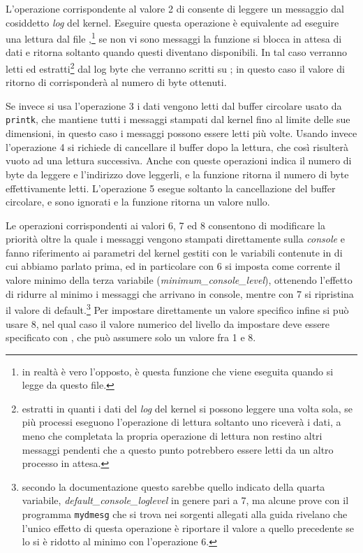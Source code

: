 L'operazione corrispondente al valore 2 di  consente di leggere un
messaggio dal cosiddetto \textit{log} del kernel. Eseguire questa operazione è
equivalente ad eseguire una lettura dal file
,\footnote{in realtà è vero l'opposto, è questa funzione
  che viene eseguita quando si legge da questo file.} se non vi sono messaggi
la funzione si blocca in attesa di dati e ritorna soltanto quando questi
diventano disponibili. In tal caso verranno letti ed
estratti\footnote{estratti in quanti i dati del \textit{log} del kernel si
  possono leggere una volta sola, se più processi eseguono l'operazione di
  lettura soltanto uno riceverà i dati, a meno che completata la propria
  operazione di lettura non restino altri messaggi pendenti che a questo punto
  potrebbero essere letti da un altro processo in attesa.} dal log 
byte che verranno scritti su ; in questo caso il valore di
ritorno di  corrisponderà al numero di byte ottenuti.

Se invece si usa l'operazione 3 i dati vengono letti dal buffer circolare
usato da \texttt{printk}, che mantiene tutti i messaggi stampati dal kernel
fino al limite delle sue dimensioni, in questo caso i messaggi possono essere
letti più volte. Usando invece l'operazione 4 si richiede di cancellare il
buffer dopo la lettura, che così risulterà vuoto ad una lettura
successiva. Anche con queste operazioni  indica il numero di byte
da leggere e  l'indirizzo dove leggerli, e la funzione ritorna
il numero di byte effettivamente letti. L'operazione 5 esegue soltanto la
cancellazione del buffer circolare,  e  sono ignorati
e la funzione ritorna un valore nullo.

Le operazioni corrispondenti ai valori 6, 7 ed 8 consentono di modificare la
priorità oltre la quale i messaggi vengono stampati direttamente sulla
\textit{console} e fanno riferimento ai parametri del kernel gestiti con le
variabili contenute in  di cui abbiamo
parlato prima, ed in particolare con 6 si imposta come corrente il valore
minimo della terza variabile (\textit{minimum\_console\_level}), ottenendo
l'effetto di ridurre al minimo i messaggi che arrivano in console, mentre con
7 si ripristina il valore di default.\footnote{secondo la documentazione
  questo sarebbe quello indicato della quarta variabile,
  \textit{default\_console\_loglevel} in genere pari a 7, ma alcune prove con
  il programma \texttt{mydmesg} che si trova nei sorgenti allegati alla guida
  rivelano che l'unico effetto di questa operazione è riportare il valore a
  quello precedente se lo si è ridotto al minimo con l'operazione 6.}  Per
impostare direttamente un valore specifico infine si può usare 8, nel qual
caso il valore numerico del livello da impostare deve essere specificato
con , che può assumere solo un valore fra 1 e 8.

